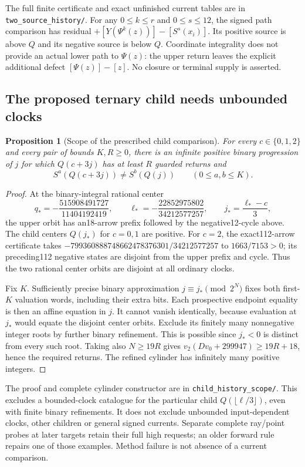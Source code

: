 \documentclass[11pt]{article}
\newtheorem{proposition}[theorem]{Proposition}
\begin{document}
The full finite certificate and exact unfinished current tables are in
\texttt{two\_source\_history/}. For any $0\le k\le r$ and
$0\le s\le12$, the signed path comparison has residual
$+[Y(\Psi^k(z))]-[S^s(x_i)]$. Its positive source is above $Q$ and
its negative source is below $Q$.
Coordinate integrality does not provide an actual lower path to $\Psi(z)$:
the upper return leaves the explicit additional defect
$[\Psi(z)]-[z]$. No closure or terminal supply is asserted.

\subsection{The proposed ternary child needs unbounded clocks}

\begin{proposition}[Scope of the prescribed child comparison]
\label{prop:prescribedchild}
For every $c\in\{0,1,2\}$ and every pair of bounds $K,R\ge0$,
there is an infinite positive binary progression of $j$ for which
$Q(c+3j)$ has at least $R$ guarded returns and
\[
 S^a(Q(c+3j))\ne S^b(Q(j))\qquad(0\le a,b\le K).
\]
\end{proposition}
\begin{proof}
At the binary-integral rational center
\[
 q_*=-\frac{515908491727}{11404192419},\qquad
 \ell_*=-\frac{22852975802}{34212577257},\qquad
 j_*=\frac{\ell_*-c}{3},
\]
the upper orbit has an18-arrow prefix followed by the negative12-cycle
above. The child centers $Q(j_*)$ for $c=0,1$ are positive. For $c=2$,
the exact112-arrow certificate takes
$-799360888748662478376301/34212577257$ to $1663/7153>0$;
its preceding112 negative states are disjoint from the upper prefix
and cycle. Thus the two rational center orbits are disjoint at all
ordinary clocks.

Fix $K$. Sufficiently precise binary approximation $j\equiv j_*
\pmod{2^N}$ fixes both first-$K$ valuation words, including their
extra bits. Each prospective endpoint equality is then an affine
equation in $j$. It cannot vanish identically, because evaluation
at $j_*$ would equate the disjoint center orbits. Exclude its finitely
many nonnegative integer roots by further binary refinement. This
is possible since $j_*<0$ is distinct from every such root.
Taking also $N\ge19R$ gives
$v_2(Dv_0+299947)\ge19R+18$, hence the required returns.
The refined cylinder has infinitely many positive integers.
\end{proof}

The proof and complete cylinder constructor are in
\texttt{child\_history\_scope/}. This excludes a bounded-clock
catalogue for the particular child $Q(\lfloor\ell/3\rfloor)$,
even with finite binary refinements. It does not exclude unbounded
input-dependent clocks, other children or general signed currents.
Separate complete ray/point probes at later targets retain their
full high requests; an older forward rule repairs one of those
examples. Method failure is not absence of a current comparison.
\end{document}
